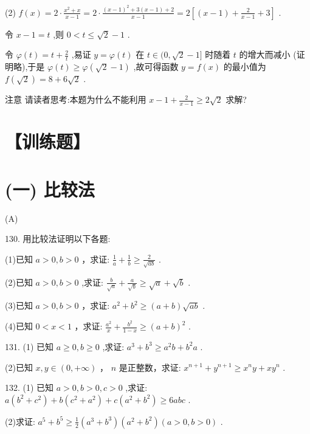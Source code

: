\documentclass[10pt]{article}
\begin{document}
(2) \(f\left( x\right)  = 2 \cdot  \frac{{x}^{2} + x}{x - 1} = 2 \cdot  \frac{{\left( x - 1\right) }^{2} + 3\left( {x - 1}\right)  + 2}{x - 1} = 2\left\lbrack  {\left( {x - 1}\right)  + \frac{2}{x - 1} + 3}\right\rbrack\) .

令 \(x - 1 = t\) ,则 \(0 < t \leq  \sqrt{2} - 1\) .

令 \(\varphi \left( t\right)  = t + \frac{2}{t}\) ,易证 \(y = \varphi \left( t\right)\) 在 \(t \in  (0,\sqrt{2} - 1\rbrack\) 时随着 \(t\) 的增大而减小 (证明略),于是 \(\varphi \left( t\right)  \geq  \varphi \left( {\sqrt{2} - 1}\right)\) ,故可得函数 \(y = f\left( x\right)\) 的最小值为 \(f\left( \sqrt{2}\right)  = 8 + 6\sqrt{2}\) .

注意 请读者思考:本题为什么不能利用 \(x - 1 + \frac{2}{x - 1} \geq  2\sqrt{2}\) 求解?

\section*{【训练题】}

\section*{(一) 比较法}

(A)

130. 用比较法证明以下各题:

(1)已知 \(a > 0,b > 0\) ，求证: \(\frac{1}{a} + \frac{1}{b} \geq  \frac{2}{\sqrt{ab}}\) .

(2)已知 \(a > 0,b > 0\) ,求证: \(\frac{b}{\sqrt{a}} + \frac{a}{\sqrt{b}} \geq  \sqrt{a} + \sqrt{b}\) .

(3)已知 \(a > 0,b > 0\) ，求证: \({a}^{2} + {b}^{2} \geq  \left( {a + b}\right) \sqrt{ab}\) .

(4)已知 \(0 < x < 1\) ，求证: \(\frac{{a}^{2}}{x} + \frac{{b}^{2}}{1 - x} \geq  {\left( a + b\right) }^{2}\) .

131. (1) 已知 \(a \geq  0,b \geq  0\) ,求证: \({a}^{3} + {b}^{3} \geq  {a}^{2}b + {b}^{2}a\) .

(2)已知 \(x,y \in  \left( {0, + \infty }\right)\) ， \(n\) 是正整数，求证: \({x}^{n + 1} + {y}^{n + 1} \geq  {x}^{n}y + x{y}^{n}\) .

132. (1) 已知 \(a > 0,b > 0,c > 0\) ,求证: \(a\left( {{b}^{2} + {c}^{2}}\right)  + b\left( {{c}^{2} + {a}^{2}}\right)  + c\left( {{a}^{2} + {b}^{2}}\right)  \geq  {6abc}\) .

(2)求证: \({a}^{5} + {b}^{5} \geq  \frac{1}{2}\left( {{a}^{3} + {b}^{3}}\right) \left( {{a}^{2} + {b}^{2}}\right) \left( {a > 0,b > 0}\right)\) .
\end{document}
